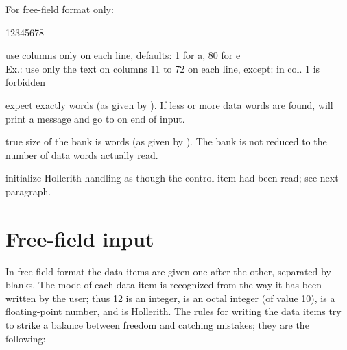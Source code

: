    For free-field format only:

\begin{DLtt}{12345678}
\item[-C\lsb{}a\rsb\lsb/e\rsb]  use columns  only on each line,
                defaults:  1 for a,   80 for e\\
                Ex.:     use only the text on columns 11 to 72
                      on each line, except:  in col. 1 is forbidden
\item[-E\lsb{}n\rsb]  expect exactly  words (as given by ).
                If less or more data words are found,  will
                print a message and go to  on end of input.
\item[-S\lsb{}n\rsb]  true size of the bank is  words (as given by ).
                The bank is not reduced to the number of data words
                actually read.
\item[-A\lsb{}n\rsb\lsb{}C\rsb\lsb{}W\rsb]  
                initialize Hollerith handling as though the control-item
                  had been read; see next paragraph.
\end{DLtt} 

\newpage
{}
\section{Free-field input}
\label{sec:TZfreefieldinput}

In free-field format the data-items are given one after the other,
separated by blanks.
The mode of each data-item is recognized from the way it
has been written by the user;
thus 12 is an integer,
 is an octal integer (of value 10),
 is a floating-point number,
and  is Hollerith.
The rules for writing the data items try to strike a balance
between freedom and catching mistakes; they are the following:

